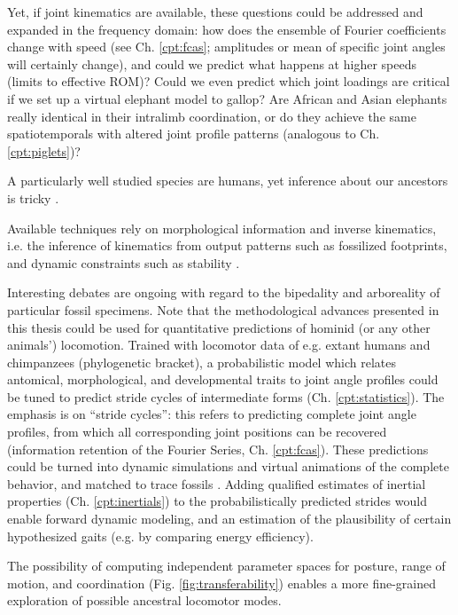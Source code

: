 Yet, if joint kinematics are available, these questions could be addressed and expanded in the frequency domain: how does the ensemble of Fourier coefficients change with speed (see Ch. \ref{cpt:fcas}; amplitudes or mean of specific joint angles will certainly change), and could we predict what happens at higher speeds (limits to effective ROM)?
Could we even predict which joint loadings are critical if we set up a virtual elephant model to gallop?
Are African and Asian elephants really identical in their intralimb coordination, or do they achieve the same spatiotemporals with altered joint profile patterns (analogous to Ch. \ref{cpt:piglets})?

\bigskip
A particularly well studied species are humans, yet inference about our ancestors is tricky \citep{Polk2004,Cazenave2023,Stamos2023}.
\begin{change}
Available techniques rely on morphological information and inverse kinematics, i.e. the inference of kinematics from output patterns such as fossilized footprints, and dynamic constraints such as stability \citep{Pronost2006,Nicolas2006,Nicolas2007,Hatala2016}.
\end{change}
Interesting debates are ongoing with regard to the bipedality and arboreality of particular fossil specimens.
Note that the methodological advances presented in this thesis could be used for quantitative predictions of hominid (or any other animals') locomotion.
Trained with locomotor data of e.g. extant humans and chimpanzees (phylogenetic bracket), a probabilistic model which relates antomical, morphological, and developmental traits to joint angle profiles could be tuned to predict stride cycles of intermediate forms (Ch. \ref{cpt:statistics}).
The emphasis is on ``stride cycles'': this refers to predicting complete joint angle profiles, from which all corresponding joint positions can be recovered (information retention of the Fourier Series, Ch. \ref{cpt:fcas}).
These predictions could be turned into dynamic simulations and virtual animations of the complete behavior, and matched to trace fossils \citep[as in][but with less manual work]{Nyakatura2019}.
Adding qualified estimates of inertial properties (Ch. \ref{cpt:inertials}) to the probabilistically predicted strides would enable forward dynamic modeling, and an estimation of the plausibility of certain hypothesized gaits (e.g. by comparing energy efficiency).
\begin{change}
The possibility of computing independent parameter spaces for posture, range of motion, and coordination (Fig. \ref{fig:transferability}) enables a more fine-grained exploration of possible ancestral locomotor modes.
\end{change}

